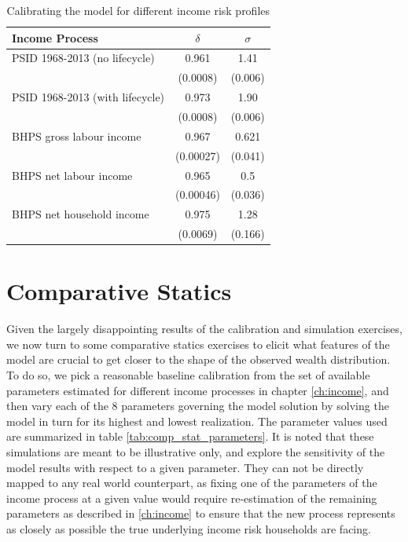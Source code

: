 \begin{table}
\begin{tabular}{l|c|c}

       Income Process            & $\delta$ & $\sigma$ \\
\hline                          
PSID 1968-2013 (no lifecycle)    &  0.961 & 1.41    \\
                  & \footnotesize{(0.0008)} & \footnotesize{(0.006)} \\ 
PSID 1968-2013 (with lifecycle)  &  0.973 & 1.90    \\
                  & \footnotesize{(0.0008)} & \footnotesize{(0.006)} \\
BHPS gross labour income         &  0.967 & 0.621    \\
                  & \footnotesize{(0.00027)} & \footnotesize{(0.041)} \\
BHPS net labour income           &  0.965 & 0.5    \\
                  & \footnotesize{(0.00046)} & \footnotesize{(0.036)} \\
BHPS net household income        &  0.975 & 1.28     \\
                  & \footnotesize{(0.0069)} & \footnotesize{(0.166)} \\

\end{tabular}
\caption{Calibrating the model for different income risk profiles}
\label{tab:calibration_results}
\end{table} 


\section{Comparative Statics}\label{sec:comp_stats}
Given the largely disappointing results of the calibration and simulation exercises,
we now turn to some comparative statics exercises to elicit what features of the 
model are crucial to get closer to the shape of the observed wealth distribution.
To do so, we pick a reasonable baseline calibration from the set of available 
parameters estimated for different income processes in chapter \ref{ch:income}, 
and then vary each of the 8 parameters governing the model solution by solving 
the model in turn for its highest and lowest realization. The parameter values
used are summarized in table \ref{tab:comp_stat_parameters}. It is noted that these
simulations are meant to be illustrative only, and explore the sensitivity of the
model results with respect to a given parameter. They can not be directly mapped
to any real world counterpart, as fixing one of the parameters of the income 
process at a given value would require re-estimation of the remaining parameters
as described in \ref{ch:income} to ensure that the new process represents as 
closely as possible the true underlying income risk households are facing.

